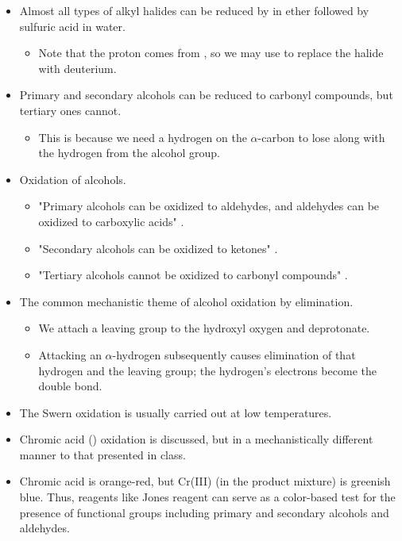 \documentclass[../notes.tex]{subfiles}
\begin{document}
\begin{itemize}
    \item Almost all types of alkyl halides can be reduced by  in ether followed by sulfuric acid in water.
    \begin{itemize}
        \item Note that the proton comes from , so we may use  to replace the halide with deuterium.
    \end{itemize}
    \item Primary and secondary alcohols can be reduced to carbonyl compounds, but tertiary ones cannot.
    \begin{itemize}
        \item This is because we need a hydrogen on the $\alpha$-carbon to lose along with the hydrogen from the alcohol group.
    \end{itemize}
    \item Oxidation of alcohols.
    \begin{itemize}
        \item {}"Primary alcohols can be oxidized to aldehydes, and aldehydes can be oxidized to carboxylic acids" \parencite[542]{bib:SolomonsEtAl}.
        \item "Secondary alcohols can be oxidized to ketones" \parencite[542]{bib:SolomonsEtAl}.
        \item "Tertiary alcohols cannot be oxidized to carbonyl compounds" \parencite[542]{bib:SolomonsEtAl}.
    \end{itemize}
    \item The common mechanistic theme of alcohol oxidation by elimination.
    \begin{itemize}
        \item We attach a leaving group to the hydroxyl oxygen and deprotonate.
        \item Attacking an $\alpha$-hydrogen subsequently causes elimination of that hydrogen and the leaving group; the hydrogen's electrons become the double bond.
    \end{itemize}
    \item The Swern oxidation is usually carried out at low temperatures.
    \item Chromic acid () oxidation is discussed, but in a mechanistically different manner to that presented in class.
    \item Chromic acid is orange-red, but Cr(III) (in the product mixture) is greenish blue. Thus, reagents like Jones reagent can serve as a color-based test for the presence of functional groups including primary and secondary alcohols and aldehydes.

\end{itemize}
\end{document}
